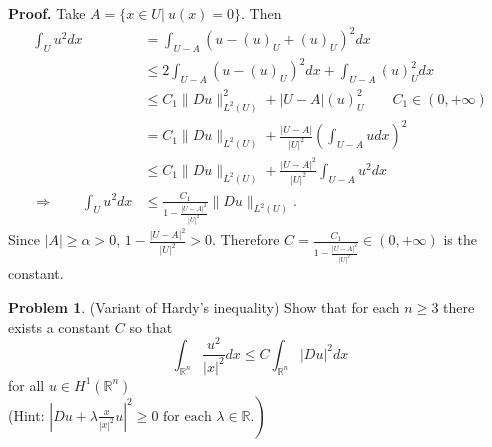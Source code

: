 \documentclass[a4paper]{book}
\newenvironment{eproof}
{\noindent\textbf{Proof.}}
{\qedhere}
\numberwithin{equation}{chapter}
\theoremstyle{definition}
\newtheorem{problem}[exm]{Problem}
\begin{document}
\begin{eproof}
  Take $A = \{x \in U \left.\right| \ u(x) = 0\}$. Then
  \begin{align*}
    \int_U u^2 dx &= \int_{U- A} (u - (u)_U + (u)_U)^2 dx \\
                  &\leq 2\int_{U-A}(u - (u)_U)^2 dx + \int_{U-A} (u)_U^2 dx \\
                  & \leq C_1 \| Du \|_{L^2(U)}^2 + \left| U-A \right|(u)_U^2 \qquad C_1 \in (0, +\infty) \\
                  & = C_1 \| Du \|_{L^2(U)} + \frac{\left| U-A \right|}{\left| U \right|^2} (\int_{U-A} u dx)^2 \\
                  &\leq C_1 \| Du \|_{L^2(U)} + \frac{\left| U-A \right|^2}{\left| U \right|^2} \int_{U-A} u^2 dx \\
    \Longrightarrow \qquad \int_U u^2 dx &\leq \frac{C_1}{1 - \frac{\left| U -A \right|^2}{\left| U \right|^2}} \| Du \|_{L^2(U)}.
  \end{align*}
  Since $\left| A \right| \geq \alpha > 0$, $1 - \frac{\left| U -A \right|^2}{\left| U \right|^2} > 0 $. Therefore $C = \frac{C_1}{1 - \frac{\left| U -A \right|^2}{\left| U \right|^2}} \in (0, +\infty) $ is the constant.
\end{eproof}
\begin{problem}
  (Variant of Hardy's inequality) Show that for each $n \geq 3$ there exists a constant $C$ so that
  \[
    \int_{\mathbb{R}^{n}} \frac{u^{2}}{|x|^{2}} d x \leq C \int_{\mathbb{R}^{n}}|D u|^{2} d x
  \]
  for all $u \in H^{1}\left(\mathbb{R}^{n}\right)$\\
  (Hint: $\left.\left|D u+\lambda \frac{x}{|x|^{2}} u\right|^{2} \geq 0 \text { for each } \lambda \in \mathbb{R} .\right)$
\end{problem}
\end{document}
